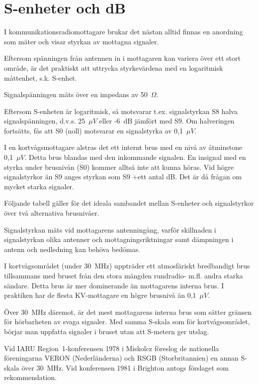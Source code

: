 \chapter{S-enheter och dB}
\label{s-enhet}

I kommunikationsradiomottagare brukar det nästan alltid finnas en
anordning som mäter och visar styrkan av mottagna signaler.

Eftersom spänningen från antennen in i mottagaren kan variera över ett stort
område, är det praktiskt att uttrycka styrkevärdena med en logaritmisk
måttenhet, s.k. S-enhet.

Signalspänningen mäts över en impedans av 50~\(\Omega\).

Eftersom S-enheten är logaritmisk, så motsvarar t.ex. signalstyrkan
S8 halva signalspänningen, d.v.s. 25~\(\mu V\) eller -6~dB jämfört med S9.
Om halveringen fortsätts, fås att S0 (noll) motsvarar en signalstyrka av 0,1~\(\mu V\).

I en kortvågsmottagare alstras det ett internt brus med en nivå av
åtminstone 0,1~\(\mu V\).
Detta brus blandas med den inkommande signalen.
En insignal med en styrka under brusnivån (S0) kommer alltså inte att
kunna höras.
Vid högre signalstyrkor än S9 anges styrkan som S9 +ett antal dB.
Det är då frågan om mycket starka signaler.

Följande tabell gäller för det ideala sambandet mellan S-enheter och
signalstyrkor över två alternativa brusnivåer.

Signalstyrkan mäts vid mottagarens antenningång, varför skillnaden i
signalstyrkan olika antenner och mottagningsriktningar samt dämpningen
i antenn och nedledning kan behöva bedömas.

I kortvågsområdet (under 30~MHz) uppträder ett atmosfäriskt bredbandigt brus
tillsammans med bruset från den stora mängden rundradio- m.fl. andra starka
sändare.
Detta brus är mer dominerande än mottagarens interna brus.
I praktiken har de flesta KV-mottagare en högre brusnivå än 0,1~\(\mu V\).

Över 30~MHz däremot, är det mest mottagarens interna brus som sätter
gränsen för hörbarheten av svaga signaler.
Med samma S-skala som för kortvågsområdet, börjar man uppfatta signaler i
bruset utan att S-metern ger utslag.

Vid IARU Region~1-konferensen 1978 i Miskolcz föreslog de nationella
föreningarna VERON (Nederländerna) och RSGB (Storbritannien) en annan
S-skala över 30~MHz.
Vid konferensen 1981 i Brighton antogs förslaget som rekommendation.

